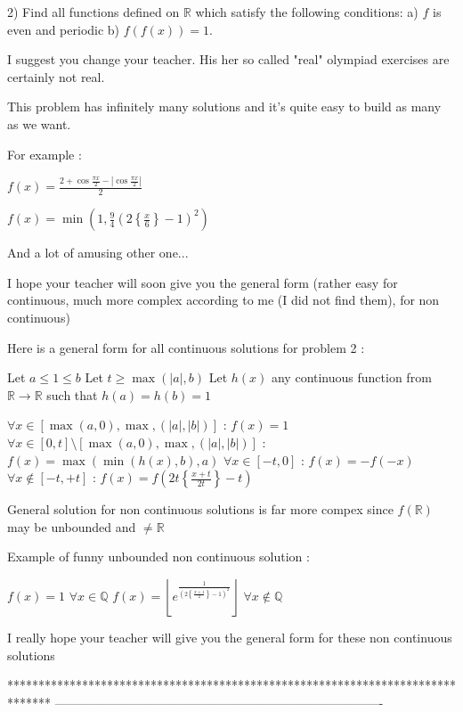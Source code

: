 \begin{solution}
	\begin{tcolorbox}2) Find all functions defined on $\mathbb R$ which satisfy the following conditions:
a) $f$ is even and periodic
b) $f(f(x)) = 1$.\end{tcolorbox}
I suggest you change your teacher. His \/ her so called "real" olympiad exercises are certainly not real.

This problem has infinitely many solutions and it's quite easy to build as many as we want.

For example : 

$f(x)=\frac{2+\cos\frac{\pi x}2-\left|\cos\frac{\pi x}2\right|}2$

$f(x)=\min\left(1,\frac 94\left(2\left\{\frac x6\right\}-1\right)^2\right)$

And a lot of amusing other one...

I hope your teacher will soon give you the general form (rather easy for continuous, much more complex according to me (I did not find them), for non continuous)
\end{solution}



\begin{solution}
	Here is a general form for all continuous solutions for problem 2 :

Let $a\le 1\le b$
Let $t\ge \max(|a|,b)$
Let $h(x)$ any continuous function from $\mathbb R\to\mathbb R$ such that $h(a)=h(b)=1$

$\forall x\in [\max(a,0),\max,(|a|,|b|)]$ : $f(x)=1$
$\forall x\in[0,t]\setminus[\max(a,0),\max,(|a|,|b|)]$ : $f(x)=\max(\min(h(x),b),a)$
$\forall x\in[-t,0]$ : $f(x)=-f(-x)$
$\forall x\notin[-t,+t]$ : $f(x)=f\left(2t\left\{\frac{x+t}{2t}\right\}-t\right)$


General solution for non continuous solutions is far more compex since $f(\mathbb R)$ may be unbounded and $\ne \mathbb R$
\end{solution}



\begin{solution}
	Example of funny unbounded non continuous solution :

$f(x)=1$ $\forall x\in\mathbb Q$
$f(x)=\left\lfloor e^{\frac 1{\left(2\left\{\frac{x+1}2\right\}-1\right)^2}}\right\rfloor$ $\forall x\notin\mathbb Q$

I really hope your teacher will give you the general form for these non continuous solutions 
\end{solution}
*******************************************************************************
-------------------------------------------------------------------------------

